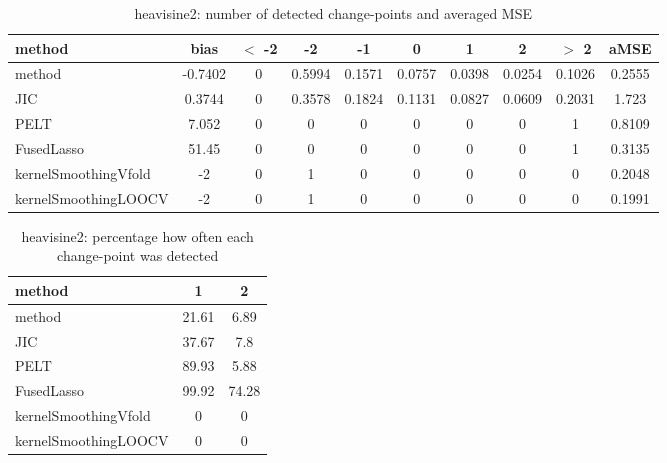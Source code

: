 \begin{table}[ht]
\centering
\begin{tabular}{l|c|ccccccc|c}
  \hline
method & bias & $<$ -2 & -2 & -1 & 0 & 1 & 2 & $>$ 2 & aMSE \\ 
  \hline
method & -0.7402 &     0 & 0.5994 & 0.1571 & 0.0757 & 0.0398 & 0.0254 & 0.1026 & 0.2555 \\ 
  JIC & 0.3744 &     0 & 0.3578 & 0.1824 & 0.1131 & 0.0827 & 0.0609 & 0.2031 & 1.723 \\ 
  PELT & 7.052 &     0 &     0 &     0 &     0 &     0 &     0 &     1 & 0.8109 \\ 
  FusedLasso & 51.45 &     0 &     0 &     0 &     0 &     0 &     0 &     1 & 0.3135 \\ 
  kernelSmoothingVfold &    -2 &     0 &     1 &     0 &     0 &     0 &     0 &     0 & 0.2048 \\ 
  kernelSmoothingLOOCV &    -2 &     0 &     1 &     0 &     0 &     0 &     0 &     0 & 0.1991 \\ 
   \hline
\end{tabular}
\caption{heavisine2: number of detected change-points and averaged MSE} 
\label{tab:heavisine2Njumps}
\end{table}
\begin{table}[ht]
\centering
\begin{tabular}{l|cc}
  \hline
method & 1 & 2 \\ 
  \hline
method &  21.61 &   6.89 \\ 
  JIC &  37.67 &    7.8 \\ 
  PELT &  89.93 &   5.88 \\ 
  FusedLasso &  99.92 &  74.28 \\ 
  kernelSmoothingVfold &      0 &      0 \\ 
  kernelSmoothingLOOCV &      0 &      0 \\ 
   \hline
\end{tabular}
\caption{heavisine2: percentage how often each change-point was detected} 
\label{tab:heavisine2Detections}
\end{table}
